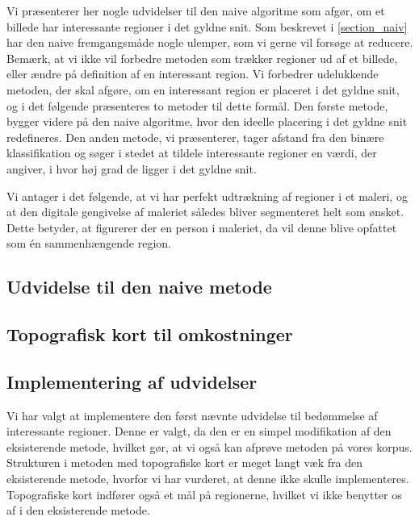 {
{\sffamily Vi præsenterer her nogle udvidelser til den naive algoritme
som afgør, om et billede har interessante regioner i det gyldne snit.
Som beskrevet i \ref{section_naiv} har den naive fremgangsmåde nogle
ulemper, som vi gerne vil forsøge at reducere. Bemærk, at vi ikke vil
forbedre metoden som trækker regioner ud af et billede, eller ændre på
definition af en interessant region. Vi forbedrer udelukkende metoden,
der skal afgøre, om en interessant region er placeret i det gyldne snit,
og i det følgende præsenteres to metoder til dette formål. Den første
metode, bygger videre på den naive algoritme, hvor den ideelle placering
i det gyldne snit redefineres. Den anden metode, vi præsenterer, tager
afstand fra den binære klassifikation og søger i stedet at tildele
interessante regioner en værdi, der angiver, i hvor høj grad de ligger i
det gyldne snit.

Vi antager i det følgende, at vi har perfekt udtrækning af regioner i et
maleri, og at den digitale gengivelse af maleriet således bliver
segmenteret helt som ønsket. Dette betyder, at figurerer der en person i
maleriet, da vil denne blive opfattet som én sammenhængende region.
}

\subsection{Udvidelse til den naive metode\label{subsec_udvidet_massemidtpunkt}}


\subsection{Topografisk kort til omkostninger}


\subsection{Implementering af udvidelser}
Vi har valgt at implementere den først nævnte udvidelse til bedømmelse
af interessante regioner. Denne er valgt, da den er en simpel
modifikation af den eksisterende metode, hvilket gør, at vi også kan
afprøve metoden på vores korpus. Strukturen i metoden med topografiske
kort er meget langt væk fra den eksisterende metode, hvorfor vi har
vurderet, at denne ikke skulle implementeres. Topografiske kort indfører
også et mål på regionerne, hvilket vi ikke benytter os af i den
eksisterende metode.

}


